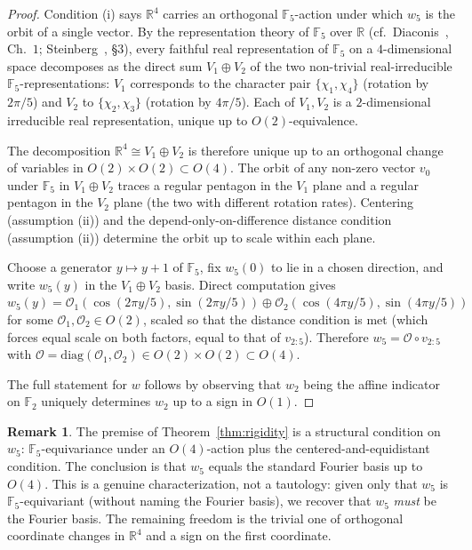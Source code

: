 \documentclass[11pt,reqno]{amsart}
\theoremstyle{definition}
\newtheorem{remark}[theorem]{Remark}
\newcommand{\R}{\mathbb{R}}
\newcommand{\F}{\mathbb{F}}
\begin{document}
\begin{proof}
Condition (i) says $\R^{4}$ carries an orthogonal $\F_{5}$-action
under which $w_{5}$ is the orbit of a single vector. By the
representation theory of $\F_{5}$ over $\R$ (cf.\
Diaconis~\cite{Diaconis1988}, Ch.~$1$;
Steinberg~\cite{Steinberg2012}, \S$3$), every faithful real
representation of $\F_{5}$ on a $4$-dimensional space decomposes
as the direct sum $V_{1} \oplus V_{2}$ of the two non-trivial
real-irreducible $\F_{5}$-representations: $V_{1}$ corresponds to
the character pair $\{\chi_{1}, \chi_{4}\}$ (rotation by $2\pi/5$)
and $V_{2}$ to $\{\chi_{2}, \chi_{3}\}$ (rotation by $4\pi/5$).
Each of $V_{1}, V_{2}$ is a $2$-dimensional irreducible real
representation, unique up to $O(2)$-equivalence.

The decomposition $\R^{4} \cong V_{1} \oplus V_{2}$ is therefore
unique up to an orthogonal change of variables in $O(2) \times
O(2) \subset O(4)$. The orbit of any non-zero vector $v_{0}$ under
$\F_{5}$ in $V_{1} \oplus V_{2}$ traces a regular pentagon in the
$V_{1}$ plane and a regular pentagon in the $V_{2}$ plane (the
two with different rotation rates). Centering (assumption (ii)) and
the depend-only-on-difference distance condition (assumption (ii))
determine the orbit up to scale within each plane.

Choose a generator $y \mapsto y + 1$ of $\F_{5}$, fix
$w_{5}(0)$ to lie in a chosen direction, and write $w_{5}(y)$ in
the $V_{1} \oplus V_{2}$ basis. Direct computation gives
$w_{5}(y) = \mathcal{O}_{1}(\cos(2\pi y/5), \sin(2\pi y/5)) \oplus
\mathcal{O}_{2}(\cos(4\pi y/5), \sin(4\pi y/5))$ for some
$\mathcal{O}_{1}, \mathcal{O}_{2} \in O(2)$, scaled so that the
distance condition is met (which forces equal scale on both
factors, equal to that of $v_{2:5}$). Therefore
$w_{5} = \mathcal{O} \circ v_{2:5}$ with
$\mathcal{O} = \mathrm{diag}(\mathcal{O}_{1}, \mathcal{O}_{2}) \in
O(2) \times O(2) \subset O(4)$.

The full statement for $w$ follows by observing that $w_{2}$ being
the affine indicator on $\F_{2}$ uniquely determines $w_{2}$ up to
a sign in $O(1)$.
\end{proof}

\begin{remark}
\label{rem:rigidity-strength}
The premise of Theorem~\ref{thm:rigidity} is a structural condition
on $w_{5}$: $\F_{5}$-equivariance under an $O(4)$-action plus the
centered-and-equidistant condition. The conclusion is that $w_{5}$
equals the standard Fourier basis up to $O(4)$. This is a genuine
characterization, not a tautology: given only that $w_{5}$ is
$\F_{5}$-equivariant (without naming the Fourier basis), we
recover that $w_{5}$ \emph{must} be the Fourier basis. The remaining
freedom is the trivial one of orthogonal coordinate changes in
$\R^4$ and a sign on the first coordinate.
\end{remark}
\end{document}
